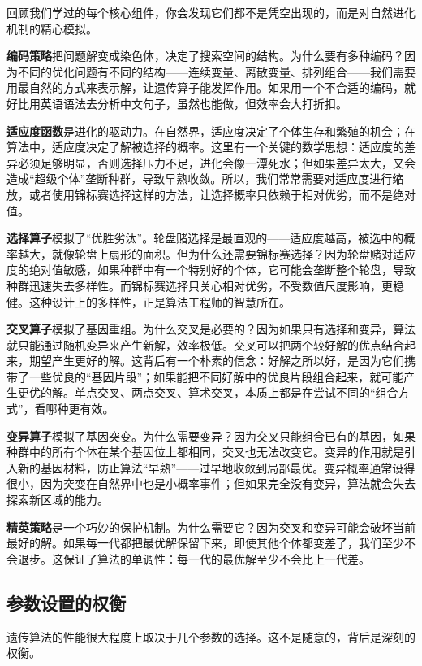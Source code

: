 \documentclass[lang=cn,zihao=-4,a4paper,fontset=windows]{beautybook}
\begin{document}
回顾我们学过的每个核心组件，你会发现它们都不是凭空出现的，而是对自然进化机制的精心模拟。

\textbf{编码策略}把问题解变成染色体，决定了搜索空间的结构。为什么要有多种编码？因为不同的优化问题有不同的结构——连续变量、离散变量、排列组合——我们需要用最自然的方式来表示解，让遗传算子能发挥作用。如果用一个不合适的编码，就好比用英语语法去分析中文句子，虽然也能做，但效率会大打折扣。

\textbf{适应度函数}是进化的驱动力。在自然界，适应度决定了个体生存和繁殖的机会；在算法中，适应度决定了解被选择的概率。这里有一个关键的数学思想：适应度的差异必须足够明显，否则选择压力不足，进化会像一潭死水；但如果差异太大，又会造成“超级个体”垄断种群，导致早熟收敛。所以，我们常常需要对适应度进行缩放，或者使用锦标赛选择这样的方法，让选择概率只依赖于相对优劣，而不是绝对值。

\textbf{选择算子}模拟了“优胜劣汰”。轮盘赌选择是最直观的——适应度越高，被选中的概率越大，就像轮盘上扇形的面积。但为什么还需要锦标赛选择？因为轮盘赌对适应度的绝对值敏感，如果种群中有一个特别好的个体，它可能会垄断整个轮盘，导致种群迅速失去多样性。而锦标赛选择只关心相对优劣，不受数值尺度影响，更稳健。这种设计上的多样性，正是算法工程师的智慧所在。

\textbf{交叉算子}模拟了基因重组。为什么交叉是必要的？因为如果只有选择和变异，算法就只能通过随机变异来产生新解，效率极低。交叉可以把两个较好解的优点结合起来，期望产生更好的解。这背后有一个朴素的信念：好解之所以好，是因为它们携带了一些优良的“基因片段”；如果能把不同好解中的优良片段组合起来，就可能产生更优的解。单点交叉、两点交叉、算术交叉，本质上都是在尝试不同的“组合方式”，看哪种更有效。

\textbf{变异算子}模拟了基因突变。为什么需要变异？因为交叉只能组合已有的基因，如果种群中的所有个体在某个基因位上都相同，交叉也无法改变它。变异的作用就是引入新的基因材料，防止算法“早熟”——过早地收敛到局部最优。变异概率通常设得很小，因为突变在自然界中也是小概率事件；但如果完全没有变异，算法就会失去探索新区域的能力。

\textbf{精英策略}是一个巧妙的保护机制。为什么需要它？因为交叉和变异可能会破坏当前最好的解。如果每一代都把最优解保留下来，即使其他个体都变差了，我们至少不会退步。这保证了算法的单调性：每一代的最优解至少不会比上一代差。

\subsection{参数设置的权衡}

遗传算法的性能很大程度上取决于几个参数的选择。这不是随意的，背后是深刻的权衡。
\end{document}
